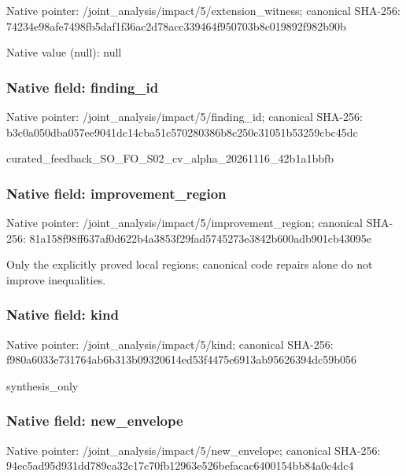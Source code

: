 \documentclass[10pt,a4paper]{article}
\begin{document}
Native pointer: /joint\_analysis/impact/5\allowbreak{}/extension\_witness; canonical SHA-256: 74234e98afe7498fb5daf1f3\allowbreak{}6ac2d78acc339464f950703b\allowbreak{}8c019892f982b90b



Native value (null): null



\subsubsection{Native field: finding\_id}


Native pointer: /joint\_analysis/impact/5/finding\_id; canonical SHA-256: b3c0a050dba057ee9041dc14\allowbreak{}cba51c570280386b8c250c31\allowbreak{}051b53259cbc45dc


curated\_feedback\_SO\_FO\_S\allowbreak{}02\_cv\_alpha\_20261116\_42b\allowbreak{}1a1bbfb


\subsubsection{Native field: improvement\_region}


Native pointer: /joint\_analysis/impact/5\allowbreak{}/improvement\_region; canonical SHA-256: 81a158f98ff637af0d622b4a\allowbreak{}3853f29fad5745273e3842b6\allowbreak{}00adb901cb43095e


Only the explicitly proved local regions; canonical code repairs alone do not improve inequalities.


\subsubsection{Native field: kind}


Native pointer: /joint\_analysis/impact/5/kind; canonical SHA-256: f980a6033e731764ab6b313b\allowbreak{}09320614ed53f4475e6913ab\allowbreak{}95626394dc59b056


synthesis\_only


\subsubsection{Native field: new\_envelope}


Native pointer: /joint\_analysis/impact/5/new\_envelope; canonical SHA-256: 94ec5ad95d931dd789ca32c1\allowbreak{}7c70fb12963e526befacac64\allowbreak{}00154bb84a0c4dc4
\end{document}
